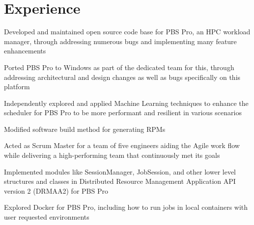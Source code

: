 \documentclass[]{deedy-resume-openfont}
\begin{document}
\hfill
\begin{minipage}[t]{0.65\textwidth} 


\section{Experience}

\vspace{\topsep} %
\vspace{0.1cm}
\begin{tightemize}
\item Developed and maintained open source code base for PBS Pro, an HPC workload manager, through addressing numerous bugs and implementing many feature enhancements
\item Ported PBS Pro to Windows as part of the dedicated team for this, through addressing architectural and design changes as well as bugs specifically on this platform
\item Independently explored and applied Machine Learning techniques to enhance the scheduler for PBS Pro to be more performant and resilient in various scenarios
\item Modified software build method for generating RPMs
\item Acted as Scrum Master for a team of five engineers aiding the Agile work flow while delivering a high-performing team that continuously met its goals
\end{tightemize}
\sectionsep
{}
\vspace{0.1cm}
\begin{tightemize}
\item Implemented modules like SessionManager, JobSession, and other lower level structures and classes in Distributed Resource Management Application API version 2 (DRMAA2) for PBS Pro
\item Explored Docker for PBS Pro, including how to run jobs in local containers with user requested environments
\end{tightemize}
\sectionsep
\vspace{0.1cm}

\end{minipage}
\end{document}
